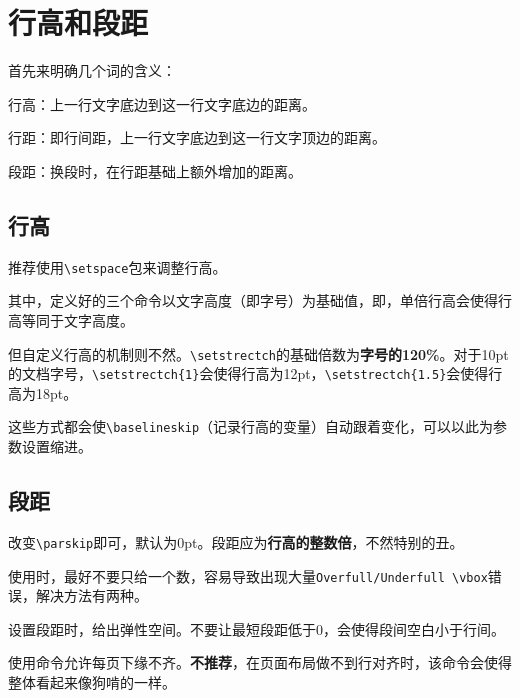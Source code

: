 \documentclass[10pt,openany]{book}
\begin{document}
\begin{sloppypar}
    \section{行高和段距}

    首先来明确几个词的含义：

    行高：上一行文字底边到这一行文字底边的距离。

    行距：即行间距，上一行文字底边到这一行文字顶边的距离。

    段距：换段时，在行距基础上额外增加的距离。

    \subsection{行高}

    推荐使用\texttt{\textbackslash{}setspace}包来调整行高。

    

    其中，定义好的三个命令以文字高度（即字号）为基础值，即，单倍行高会使得行高等同于文字高度。

    但自定义行高的机制则不然。\texttt{\textbackslash{}setstrectch}的基础倍数为\textbf{字号的120\%}。对于10pt的文档字号，\texttt{\textbackslash{}setstrectch\{1\}}会使得行高为12pt，\texttt{\textbackslash{}setstrectch\{1.5\}}会使得行高为18pt。

    这些方式都会使\texttt{\textbackslash{}baselineskip}（记录行高的变量）自动跟着变化，可以以此为参数设置缩进。

    \subsection{段距}

    改变\texttt{\textbackslash{}parskip}即可，默认为0pt。段距应为\textbf{行高的整数倍}，不然特别的丑。

    

    使用时，最好不要只给一个数，容易导致出现大量\texttt{Overfull/Underfull\ \textbackslash{}vbox}错误，解决方法有两种。

    \begin{tightenum}
        \item   设置段距时，给出弹性空间。不要让最短段距低于0，会使得段间空白小于行间。
        \item   使用命令允许每页下缘不齐。\textbf{不推荐}，在页面布局做不到行对齐时，该命令会使得整体看起来像狗啃的一样。
    \end{tightenum}


\end{sloppypar}
\end{document}
